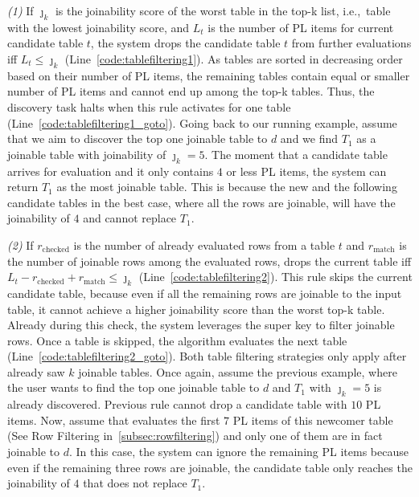 \noindent\textit{(1) } If $\jmath_k$ is the joinability score of the worst table in the top-k list, i.e.,~table with the lowest joinability score, and $L_t$ is the number of PL items for current candidate table $t$, the system drops the candidate table $t$ from further evaluations iff $L_t \leq \jmath_k$ (Line~\ref{code:tablefiltering1}).
As tables are sorted in decreasing order based on their number of PL items, the remaining tables contain equal or smaller number of PL items and cannot end up among the top-k tables. Thus, the discovery task halts when this rule activates for one table (Line~\ref{code:tablefiltering1_goto}). 
Going back to our running example, assume that we aim to discover the top one joinable table to $d$ and we find $T_1$ as a joinable table with joinability of $\jmath_k = 5$. The moment that a candidate table arrives for evaluation and it only contains $4$ or less PL items, the system can return $T_1$ as the most joinable table. This is because the new and the following candidate tables in the best case, where all the rows are joinable, will have the joinability of $4$ and cannot replace $T_1$.

\noindent\textit{(2) } If $r_{\text{checked}}$ is the number of already evaluated rows from a table $t$ and $r_{\text{match}}$ is the number of joinable rows among the evaluated rows, \system drops the current table iff $L_t - r_{\text{checked}} + r_{\text{match}} \leq \jmath_k$ (Line~\ref{code:tablefiltering2}).
This rule skips the current candidate table, because even if all the remaining rows are joinable to the input table, it cannot achieve a higher joinability score than the worst top-k table.
Already during this check, the system leverages the super key to filter joinable rows. Once a table is skipped, the algorithm evaluates the next table (Line~\ref{code:tablefiltering2_goto}).
Both table filtering strategies only apply after \system already saw $k$ joinable tables.
Once again, assume the previous example, where the user wants to find the top one joinable table to $d$ and $T_1$ with $\jmath_k = 5$ is already discovered. Previous rule cannot drop a candidate table with $10$ PL items. Now, assume that \system evaluates the first $7$ PL items of this newcomer table (See Row Filtering in~\ref{subsec:rowfiltering}) and only one of them are in fact joinable to $d$. In this case, the system can ignore the remaining PL items because even if the remaining three rows are joinable, the candidate table only reaches the joinability of $4$ that does not replace $T_1$.


